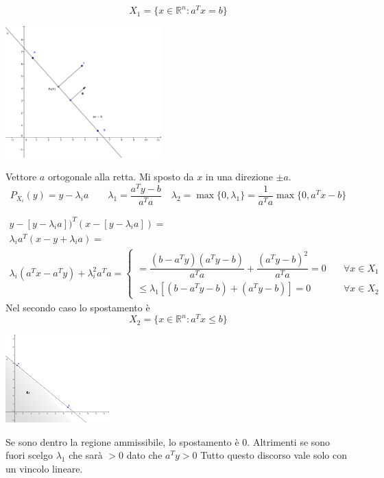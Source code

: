 \begin{example}
$$X_1 = \{ x \in \mathbb{R}^{n} : a^{T}x= b \}$$

\begin{center}
  \includegraphics[width=0.45\textwidth]{imgs/vincololineare.png}
\end{center}

Vettore $a$ ortogonale alla retta. Mi sposto da $x$ in una direzione $\pm a$.
\\
$$
P_{X_i}(y) = y - \lambda_i a \qquad
\lambda_1 = \dfrac{a^{T}y-b}{a^{T}a} \quad 
\lambda_2 = \max\{0, \lambda_1\} = \dfrac{1}{a^{T}a}\max\{0,a^{T}x-b\}$$

$$
\begin{array}{l}
 y - [y - \lambda_ia])^{T}(x - [y -\lambda_i a]) =  \\
\lambda_i a^{T}(x - y + \lambda_i a) =  \\
\lambda_i (a^{T}x - a^{T}y) + \lambda_i^{2} a^{T}a = 
\left\{
\begin{array}{ll}
 = \dfrac{(b -a^{T}y)(a^{T}y-b)}{a^Ta} + \dfrac{(a^{T}y -b)^{2}}{a^{T}a}=0
\quad & \forall x \in X_1 \\
\leq \lambda_1[(b-a^{T}y -b ) + (a^{T}y -b)] = 0 \quad & \forall 
x \in X_2
\end{array}
\right.  
\end{array}
$$
Nel secondo caso lo spostamento \`e
$$X_2 = \{ x \in \mathbb{R}^{n} : a^{T}x \leq  b \}$$

\begin{center}
  \includegraphics[width=0.3\textwidth]{imgs/vincololineare2.png}
\end{center}
Se sono dentro la regione ammissibile, lo spostamento \`e 0. Altrimenti se sono fuori scelgo $\lambda _1$ che sar\`a $ > 0$ dato che $a^{T}y > 0$
Tutto questo discorso vale solo con un vincolo lineare.
\end{example}

